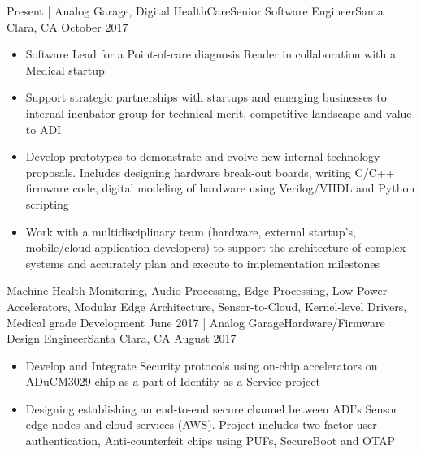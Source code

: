 %
%
%

\begin{experiences}
  \experience
    {Present}   {| Analog Garage, Digital HealthCare}{Senior Software Engineer}{Santa Clara, CA}
    {October 2017} {
                      \begin{itemize}
                        \item Software Lead for a Point-of-care diagnosis Reader in collaboration with a Medical startup
                        \item Support strategic partnerships with startups and emerging businesses to internal incubator group for technical merit, competitive landscape and value to ADI
                        \item Develop prototypes to demonstrate and evolve new internal technology proposals. Includes designing hardware break-out boards, writing C/C++ firmware code, digital modeling of hardware using Verilog/VHDL and Python scripting
                        \item Work with a multidisciplinary team (hardware, external startup’s, mobile/cloud application developers) to support the architecture of complex systems and accurately plan and execute to implementation milestones\\
                      \end{itemize}
                    }
                    {Machine Health Monitoring, Audio Processing, Edge Processing, Low-Power Accelerators, Modular Edge Architecture, Sensor-to-Cloud, Kernel-level Drivers, Medical grade Development}
  \emptySeparator
  \experience
    {June 2017}       {| Analog Garage}{Hardware/Firmware Design Engineer}{Santa Clara, CA}
    {August 2017}    {
                      \begin{itemize}
                        \item Develop and Integrate Security protocols using on-chip accelerators on ADuCM3029 chip as a part of Identity as a Service project
                        \item Designing establishing an end-to-end secure channel between ADI's Sensor edge nodes and cloud services (AWS). Project includes two-factor user-authentication, Anti-counterfeit chips using PUFs, SecureBoot and OTAP \\

\end{itemize}}
\end{experiences}
